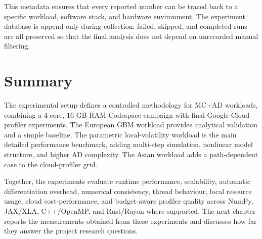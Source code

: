 This metadata ensures that every reported number can be traced back to a
specific workload, software stack, and hardware environment.  The experiment
database is append-only during collection: failed, skipped, and completed
runs are all preserved so that the final analysis does not depend on
unrecorded manual filtering.

\section{Summary}
\label{sec:exp-summary}

The experimental setup defines a controlled methodology for MC+AD workloads,
combining a 4-core, 16 GB RAM Codespace campaign with final Google Cloud
profiler experiments.  The European GBM workload provides analytical
validation and a simple baseline. The parametric local-volatility workload is
the main detailed performance benchmark, adding multi-step simulation,
nonlinear model structure, and higher AD complexity. The Asian workload adds a
path-dependent case to the cloud-profiler grid.

Together, the experiments evaluate runtime performance, scalability,
automatic differentiation overhead, numerical consistency, thread behaviour,
local resource usage, cloud cost-performance, and budget-aware profiler
quality across NumPy, JAX/XLA, C++/OpenMP, and Rust/Rayon where supported.
The next chapter reports the measurements obtained from these experiments
and discusses how far they answer the project research questions.

